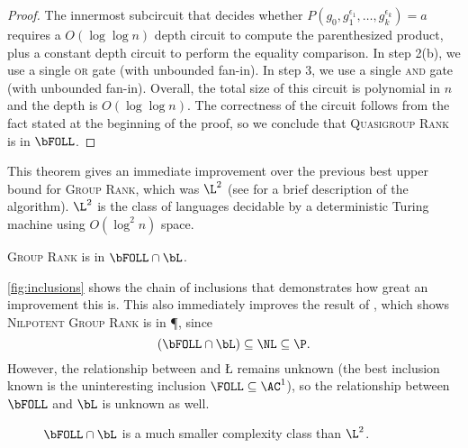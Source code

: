 \documentclass{article}
\begin{document}
\begin{proof}
  The innermost subcircuit that decides whether $P(g_0, g_1^{\epsilon_1}, \dotsc, g_k^{\epsilon_k}) = a$ requires a $O(\log \log n)$ depth circuit to compute the parenthesized product, plus a constant depth circuit to perform the equality comparison.
  In step 2(b), we use a single \textsc{or} gate (with unbounded fan-in).
  In step 3, we use a single \textsc{and} gate (with unbounded fan-in).
  Overall, the total size of this circuit is polynomial in $n$ and the depth is $O(\log \log n)$.
  The correctness of the circuit follows from the fact stated at the beginning of the proof, so we conclude that \textsc{Quasigroup Rank} is in $\bFOLL$.
\end{proof}

This theorem gives an immediate improvement over the previous best upper bound for \textsc{Group Rank}, which was $\L^2$ \cite{lsz77} (see \cite[Proposition~3]{at06} for a brief description of the algorithm).
$\L^2$ is the class of languages decidable by a deterministic Turing machine using $O(\log^2 n)$ space.

\begin{corollary}\label{cor:grouprank}
  \textsc{Group Rank} is in $\bFOLL \cap \bL$.
\end{corollary}

\autoref{fig:inclusions} shows the chain of inclusions that demonstrates how great an improvement this is.
This also immediately improves the result of \cite[Theorem~7]{at06}, which shows \textsc{Nilpotent Group Rank} is in \P, since
$$
(\bFOLL \cap \bL) \subseteq \NL \subseteq \P.
$$
However, the relationship between \FOLL{} and \L{} remains unknown (the best inclusion known is the uninteresting inclusion $\FOLL \subseteq \AC^1$), so the relationship between $\bFOLL$ and $\bL$ is unknown as well.

\begin{figure}
  \caption{\label{fig:inclusions}$\bFOLL \cap \bL$ is a much smaller complexity class than $\L^2$.}
  \begin{center}
  \end{center}
\end{figure}
\end{document}
